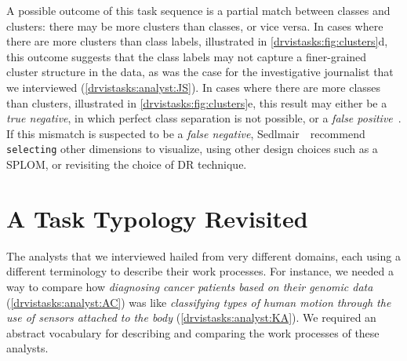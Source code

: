 A possible outcome of this task sequence is a partial match between classes and clusters: there may be more clusters than classes, or vice versa.
In cases where there are more clusters than class labels, illustrated in \autoref{drvistasks:fig:clusters}d, this outcome suggests that the class labels may not capture a finer-grained cluster structure in the data, as was the case for the investigative journalist that we interviewed (\ref{drvistasks:analyst:JS}). 
In cases where there are more classes than clusters, illustrated in \autoref{drvistasks:fig:clusters}e, this result may either be a {\it true negative}, in which perfect class separation is not possible, or a {\it false positive}~\cite{Sedlmair2013}.
If this mismatch is suspected to be a {\it false negative}, Sedlmair~\etal~recommend {\tt selecting} other dimensions to visualize, using other design choices such as a \ac{SPLOM}, or revisiting the choice of \ac{DR} technique. 


\section{A Task Typology Revisited}
\label{drvistasks:typology}


The analysts that we interviewed hailed from very different domains, each using a different terminology to describe their work processes.
For instance, we needed a way to compare how {\it diagnosing cancer patients based on their genomic data} (\ref{drvistasks:analyst:AC}) was like {\it classifying types of human motion through the use of sensors attached to the body} (\ref{drvistasks:analyst:KA}).
We required an abstract vocabulary for describing and comparing the work processes of these analysts.

